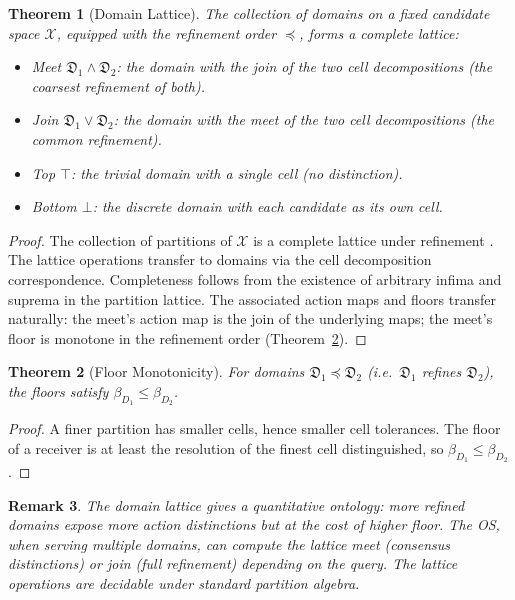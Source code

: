 \documentclass[11pt,a4paper]{article}
\newtheorem{theorem}{Theorem}[section]
\newtheorem{remark}[theorem]{Remark}
\newcommand{\Cands}{\mathcal{X}}
\newcommand{\Domain}{\mathfrak{D}}
\begin{document}
\begin{theorem}[Domain Lattice]
\label{thm:domain-lattice}
The collection of domains on a fixed candidate space $\Cands$, equipped with the refinement order $\preceq$, forms a complete lattice:
\begin{itemize}[nosep, leftmargin=*]
\item \emph{Meet} $\Domain_1 \wedge \Domain_2$: the domain with the join of the two cell decompositions (the coarsest refinement of both).
\item \emph{Join} $\Domain_1 \vee \Domain_2$: the domain with the meet of the two cell decompositions (the common refinement).
\item \emph{Top} $\top$: the trivial domain with a single cell (no distinction).
\item \emph{Bottom} $\bot$: the discrete domain with each candidate as its own cell.
\end{itemize}
\end{theorem}

\begin{proof}
The collection of partitions of $\Cands$ is a complete lattice under refinement \citep{birkhoff1948lattice,davey2002introduction}. The lattice operations transfer to domains via the cell decomposition correspondence. Completeness follows from the existence of arbitrary infima and suprema in the partition lattice. The associated action maps and floors transfer naturally: the meet's action map is the join of the underlying maps; the meet's floor is monotone in the refinement order (Theorem~\ref{thm:floor-monotone}).
\end{proof}

\begin{theorem}[Floor Monotonicity]
\label{thm:floor-monotone}
For domains $\Domain_1 \preceq \Domain_2$ (i.e.\ $\Domain_1$ refines $\Domain_2$), the floors satisfy $\beta_{D_1} \leq \beta_{D_2}$.
\end{theorem}

\begin{proof}
A finer partition has smaller cells, hence smaller cell tolerances. The floor of a receiver is at least the resolution of the finest cell distinguished, so $\beta_{D_1} \leq \beta_{D_2}$.
\end{proof}

\begin{remark}
\label{rem:lattice-meaning}
The domain lattice gives a quantitative ontology: more refined domains expose more action distinctions but at the cost of higher floor. The OS, when serving multiple domains, can compute the lattice meet (consensus distinctions) or join (full refinement) depending on the query. The lattice operations are decidable under standard partition algebra.
\end{remark}
\end{document}
